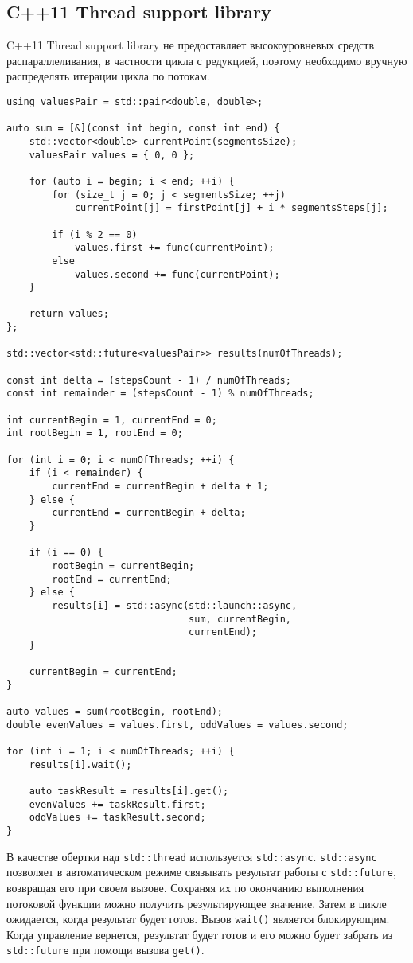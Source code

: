 \documentclass{report}
\begin{document}
\subsection*{C++11 Thread support library}
C++11 Thread support library не предоставляет высокоуровневых средств распараллеливания, в частности цикла с редукцией, поэтому необходимо вручную распределять итерации цикла по потокам.
\begin{lstlisting}
using valuesPair = std::pair<double, double>;

auto sum = [&](const int begin, const int end) {
    std::vector<double> currentPoint(segmentsSize);
    valuesPair values = { 0, 0 };

    for (auto i = begin; i < end; ++i) {
        for (size_t j = 0; j < segmentsSize; ++j)
            currentPoint[j] = firstPoint[j] + i * segmentsSteps[j];

        if (i % 2 == 0)
            values.first += func(currentPoint);
        else
            values.second += func(currentPoint);
    }

    return values;
};

std::vector<std::future<valuesPair>> results(numOfThreads);

const int delta = (stepsCount - 1) / numOfThreads;
const int remainder = (stepsCount - 1) % numOfThreads;

int currentBegin = 1, currentEnd = 0;
int rootBegin = 1, rootEnd = 0;

for (int i = 0; i < numOfThreads; ++i) {
    if (i < remainder) {
        currentEnd = currentBegin + delta + 1;
    } else {
        currentEnd = currentBegin + delta;
    }

    if (i == 0) {
        rootBegin = currentBegin;
        rootEnd = currentEnd;
    } else {
        results[i] = std::async(std::launch::async,
                                sum, currentBegin,
                                currentEnd);
    }

    currentBegin = currentEnd;
}

auto values = sum(rootBegin, rootEnd);
double evenValues = values.first, oddValues = values.second;

for (int i = 1; i < numOfThreads; ++i) {
    results[i].wait();

    auto taskResult = results[i].get();
    evenValues += taskResult.first;
    oddValues += taskResult.second;
}
\end{lstlisting}
\par В качестве обертки над \verb|std::thread| используется \verb|std::async|. \verb|std::async| позволяет в автоматическом режиме связывать результат работы с \verb|std::future|, возвращая его при своем вызове. Сохраняя их по окончанию выполнения потоковой функции можно получить результирующее значение. Затем в цикле ожидается, когда результат будет готов. Вызов \verb|wait()| является блокирующим. Когда управление вернется, результат будет готов и его можно будет забрать из \verb|std::future| при помощи вызова \verb|get()|.
\end{document}
